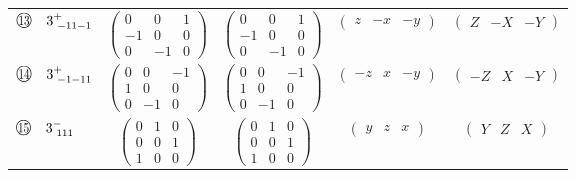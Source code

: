 \documentclass[fleqn,10pt,landscape]{jsarticle}
\begin{document}
\begin{center}
\begin{longtable}{lcccc}
$ {\ooalign{\hfil\resizebox{.8\width}{\height}{13}\hfil\crcr\raise.1ex\hbox{\large$\bigcirc$}}}\quad 3^{+}_{\,\,-11-1} $ & $ \begin{pmatrix} 0 & 0 & 1 \\ -1 & 0 & 0 \\ 0 & -1 & 0 \end{pmatrix} $ & $ \begin{pmatrix} 0 & 0 & 1 \\ -1 & 0 & 0 \\ 0 & -1 & 0 \end{pmatrix} $ & $ \begin{pmatrix} z & - x & - y \end{pmatrix} $ & $ \begin{pmatrix} Z & - X & - Y \end{pmatrix} $ \\
$ {\ooalign{\hfil\resizebox{.8\width}{\height}{14}\hfil\crcr\raise.1ex\hbox{\large$\bigcirc$}}}\quad 3^{+}_{\,\,-1-11} $ & $ \begin{pmatrix} 0 & 0 & -1 \\ 1 & 0 & 0 \\ 0 & -1 & 0 \end{pmatrix} $ & $ \begin{pmatrix} 0 & 0 & -1 \\ 1 & 0 & 0 \\ 0 & -1 & 0 \end{pmatrix} $ & $ \begin{pmatrix} - z & x & - y \end{pmatrix} $ & $ \begin{pmatrix} - Z & X & - Y \end{pmatrix} $ \\
$ {\ooalign{\hfil\resizebox{.8\width}{\height}{15}\hfil\crcr\raise.1ex\hbox{\large$\bigcirc$}}}\quad 3^{-}_{\,\,111} $ & $ \begin{pmatrix} 0 & 1 & 0 \\ 0 & 0 & 1 \\ 1 & 0 & 0 \end{pmatrix} $ & $ \begin{pmatrix} 0 & 1 & 0 \\ 0 & 0 & 1 \\ 1 & 0 & 0 \end{pmatrix} $ & $ \begin{pmatrix} y & z & x \end{pmatrix} $ & $ \begin{pmatrix} Y & Z & X \end{pmatrix} $ \\

\end{longtable}
\end{center}
\end{document}
